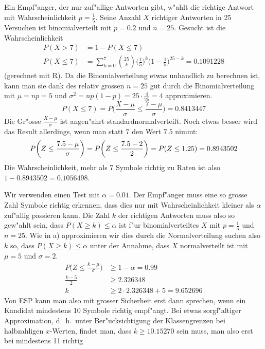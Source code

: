 \begin{loesung}
\begin{teilaufgaben}
\item Ein Empf"anger, der nur zuf"allige Antworten gibt, w"ahlt
die richtige Antwort mit Wahrscheinlichkeit $p=\frac15$.
Seine Anzahl $X$ richtiger Antworten in 25 Versuchen ist binomialverteilt mit
$p=0.2$ und $n=25$. Gesucht ist die Wahrscheinlichkeit
\begin{align*}
P(X > 7)&= 1 - P(X\le 7)\\
P(X\le 7)&=\sum_{k=0}^7\binom{25}{k}
\biggl(\frac15\biggr)^k
\biggl(1-\frac15\biggr)^{25-k}
 = 0.1091228
\end{align*}
(gerechnet mit R).
Da die Binomialverteilung etwas unhandlich zu berechnen ist, kann man sie
dank des relativ grossen $n=25$ gut durch die Binomialverteilung
mit $\mu=np=5$ und $\sigma^2=np(1-p)=25\cdot\frac{4}{25}=4$
approximieren.
\[
P(X\le 7)=P\biggl(\frac{X-\mu}{\sigma}\le \frac{7-\mu}{\sigma}\biggr)
=
0.8413447
\]
Die Gr"osse $\frac{X-\mu}{\sigma}$ ist angen"ahrt standardnormalverteilt.
Noch etwas besser wird das Result allerdings, wenn man statt $7$ den
Wert $7.5$ nimmt:
\[
P\biggl(Z\le\frac{7.5-\mu}{\sigma}\biggr)
=
P\biggl(Z\le \frac{7.5-2}{2}\biggr)
=
P(Z\le 1.25)=0.8943502\\
\]
Die Wahrscheinlichkeit, mehr als 7 Symbole richtig zu Raten ist
also $1-0.8943502= 0.1056498$.
\item
Wir verwenden einen Test mit $\alpha=0.01$.
Der Empf"anger muss eine so grosse Zahl Symbole richtig erkennen,
dass dies nur mit Wahrscheinlichkeit kleiner als $\alpha$ zuf"allig
passieren kann.
Die Zahl $k$ der richtigen Antworten muss also so gew"ahlt sein,
dass $P(X\ge k) \le \alpha$ ist f"ur binomialverteiltes $X$ mit $p=\frac15$
und $n=25$. Wie in a) approximieren wir dies durch die Normalverteilung
suchen also $k$ so, dass $P(X\ge k)\le\alpha$ unter der Annahme, dass
$X$ normalverteilt ist mit $\mu=5$ und $\sigma=2$.
\begin{align*}
P\biggl(Z\le \frac{k - \mu}{\sigma}\biggr)&\ge 1-\alpha=0.99\\
\frac{k-5}2&\ge 2.326348\\
k&\ge 2\cdot 2.326348 + 5=9.652696
\end{align*}
Von ESP kann man also mit grosser Sicherheit erst dann sprechen, wenn
ein Kandidat mindestens 10 Symbole richtig empf"angt.
Bei etwas sorgf"altiger Approximation, d.~h.~unter Ber"ucksichtigung
der Klassengrenzen bei halbzahligen $x$-Werten, findet man, dass
$k\ge 10.15270$ sein muss, man also erst bei mindestens 11 richtig

\end{teilaufgaben}
\end{loesung}
